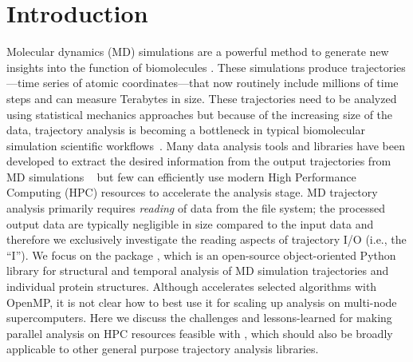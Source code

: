 
\section{Introduction}
\label{sec:introduction}

Molecular dynamics (MD) simulations are a powerful method to generate new insights into the function of biomolecules \cite{Borhani:2012mi, Dror:2012cr, Orozco:2014dq, Perilla:2015kx, Bottaro:2018aa}.
These simulations produce trajectories---time series of atomic coordinates---that now routinely include millions of time steps and can measure Terabytes in size.
These trajectories need to be analyzed using statistical mechanics approaches \cite{Tuckerman:2010cr, Mura:2014kx} but because of the increasing size of the data, trajectory analysis is becoming a bottleneck in typical biomolecular simulation scientific workflows~\cite{Cheatham:2015}.
Many data analysis tools and libraries have been developed to extract the desired information from the output trajectories from MD simulations ~\cite{nmoldyn, nmoldyn-2012, Hum96, Hinsen:2000kx, Grant:2006ud, himach-2008, Romo:2009zr, Romo:2014bh, Michaud-Agrawal:2011fu, Gowers:2016aa, cpptraj-2013, McGibbon:2015aa, pteros2015, Doerr:2016aa} but few can efficiently use modern High Performance Computing (HPC) resources to accelerate the analysis stage.
MD trajectory analysis primarily requires \emph{reading} of data from the file system; the processed output data are typically negligible in size compared to the input data and therefore we exclusively investigate the reading aspects of trajectory I/O (i.e., the ``I'').
We focus on the  package \cite{Gowers:2016aa,Michaud-Agrawal:2011fu}, which is an open-source object-oriented Python library for structural and temporal analysis of MD simulation trajectories and individual protein structures.
Although  accelerates selected algorithms with OpenMP, it is not clear how to best use it for scaling up analysis on multi-node supercomputers.
Here we discuss the challenges and lessons-learned for making parallel analysis on HPC resources feasible with , which should also be broadly applicable to other general purpose trajectory analysis libraries.

